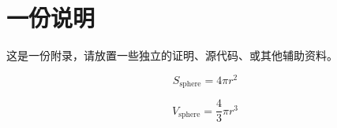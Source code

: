 \chapter{一份说明}
这是一份附录，请放置一些独立的证明、源代码、或其他辅助资料。

\begin{equation}
    S_{\text{sphere}} = 4 \pi r^2
\end{equation}

\begin{equation}
    V_{\text{sphere}} = \frac43 \pi r^3
\end{equation}